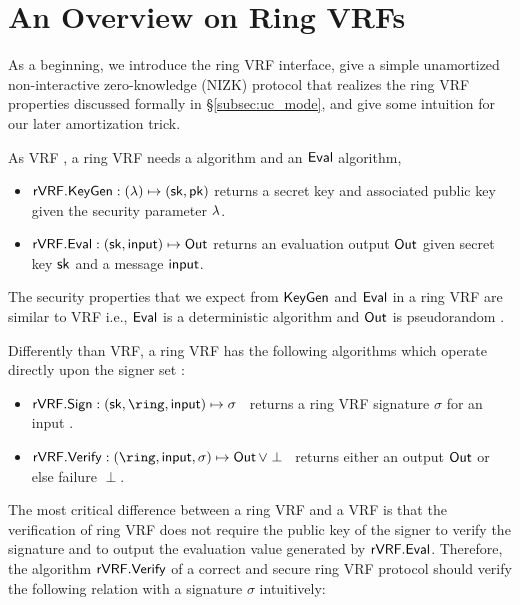 \section{An Overview on Ring VRFs}
\label{sec:overview}

As a beginning, we introduce the ring VRF interface, give a simple
unamortized non-interactive zero-knowledge (NIZK) protocol that realizes the ring VRF properties discussed formally in \S\ref{subsec:uc_mode},
and give some intuition for our later amortization trick. 


As VRF \cite{vrf_micali}, a ring VRF needs a \KeyGen algorithm and an $ {\mathsf{Eval}} $ algorithm,

\begin{itemize}
	\item $ {\mathsf{rVRF}}.{\mathsf{KeyGen}}: (\lambda) \mapsto (\mathsf{sk}, \mathsf{pk}) $  returns a secret key \sk and
	associated public key \pk given the security parameter $ \lambda $.
	\item ${\mathsf{rVRF}}.{\mathsf{Eval}} : (\mathsf{sk},\mathsf{input}) \mapsto {\ensuremath{\mathsf{Out}}}$ returns an evaluation output $ {\mathsf{Out}} $ given secret key $ \mathsf{sk} $ and a message $ \mathsf{input} $.
\end{itemize}
The security properties that we expect from $ {\mathsf{KeyGen}} $ and $ {\mathsf{Eval}} $ in a ring VRF are similar to VRF i.e., $ {\mathsf{Eval}} $ is a deterministic algorithm and $ {\mathsf{Out}} $ is pseudorandom \cite{praos,ucvrf}.
%


Differently than VRF, a ring VRF has the following algorithms which operate directly
upon the signer set \ring:
\begin{itemize}
\item $\rVRF.\rSign : (\sk,\ring,\msg) \mapsto \sigma$ \,
    returns a ring VRF signature $\sigma$ for an input \msg.
\item $\rVRF.\rVerify : (\ring,\msg,\sigma) \mapsto \Out \, \lor \perp$ \,
    returns either an output ${\mathsf{Out}}$ or else failure $\perp$.
\end{itemize}

The most critical difference between a ring VRF and a VRF is that the verification of ring VRF does not require the public key of the signer to verify the signature and to output the evaluation value generated by $ {\mathsf{rVRF}}.{\mathsf{Eval}} $. Therefore, the algorithm $ {\mathsf{rVRF}}.{\mathsf{Verify}} $ of a correct and secure ring VRF protocol should verify the following relation with a signature $ \sigma $ intuitively:  


